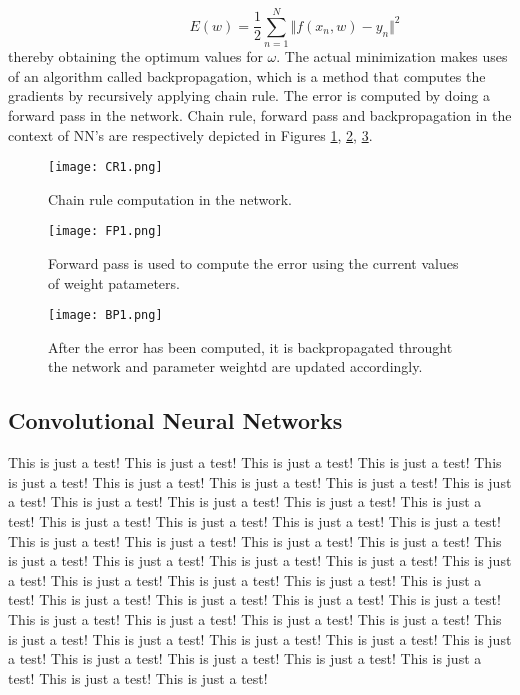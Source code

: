 \begin{itemize}
\begin{equation} \label{eq:LS1}
\hspace{3em} \hspace{3em} \hspace{3em} E (w) = \frac{1}{2} \sum\limits_{n=1}^N \Vert f(x_n,w) - y_n\Vert^2 \enspace \enspace \hspace{3em}
\end{equation} 
thereby obtaining the optimum values for $\omega$. The actual minimization makes uses of an algorithm called backpropagation, which is a method that computes the gradients by recursively applying chain rule. The error is computed by doing a forward pass in the network. Chain rule, forward pass and backpropagation in the context of NN's are respectively depicted in Figures \ref{fig:CRim1}, \ref{fig:FPim1}, \ref{fig:BPim1}.   

\end{itemize} 
\begin{figure}[tb] 
\centering 
\texttt{[image: CR1.png]} 
\caption[Chain rule in neural networks]{Chain rule computation in the network.}
\label{fig:CRim1} 
\end{figure}
\begin{figure}[tb] 
\centering 
\texttt{[image: FP1.png]} 
\caption[Forward pass to compute error]{Forward pass is used to compute the error using the current values of weight patameters.}
\label{fig:FPim1} 
\end{figure}
\begin{figure}[tb] 
\centering 
\texttt{[image: BP1.png]} 
\caption[Backpropagation process through the network]{After the error has been computed, it is backpropagated throught the network and parameter weightd are updated accordingly.}
\label{fig:BPim1} 
\end{figure} 	
    

\subsection{Convolutional Neural Networks}
This is just a test! This is just a test! This is just a test! This is just a test! This is just a test! This is just a test! This is just a test! This is just a test! This is just a test! This is just a test! This is just a test! This is just a test! This is just a test! This is just a test! This is just a test! This is just a test! This is just a test! This is just a test! This is just a test! This is just a test! This is just a test! This is just a test! This is just a test! This is just a test! This is just a test! This is just a test! This is just a test! This is just a test! This is just a test! This is just a test! This is just a test! This is just a test! This is just a test! This is just a test! This is just a test! This is just a test! This is just a test! This is just a test! This is just a test! This is just a test! This is just a test! This is just a test! This is just a test! This is just a test! This is just a test! This is just a test! This is just a test! This is just a test! This is just a test!

